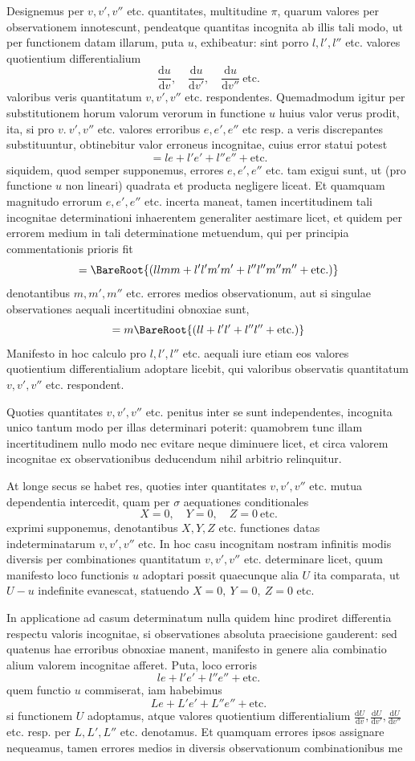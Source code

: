 Designemus per \(v,v',v''\) etc. quantitates, multitudine \(\pi\), quarum valores per observationem innotescunt, pendeatque quantitas incognita ab illis tali modo, ut per functionem datam illarum, puta \(u\), exhibeatur: sint porro \(l,l',l''\) etc. valores quotientium differentialium
\[
\frac{\mathrm du}{\mathrm dv},\quad \frac{\mathrm du}{\mathrm dv'},\quad \frac{\mathrm du}{\mathrm dv''}\ \text{etc.}
\]
valoribus veris quantitatum \(v,v',v''\) etc. respondentes. Quemadmodum igitur per substitutionem horum valorum verorum in functione \(u\) huius valor verus prodit, ita, si pro \(v.\ v',v''\) etc. valores erroribus \(e,e',e''\) etc resp. a veris discrepantes substituuntur, obtinebitur valor erroneus incognitae, cuius error statui potest
\[
=le+l'e'+l''e''+\text{etc.}
\]
siquidem, quod semper supponemus, errores \(e,e',e''\) etc. tam exigui sunt, ut (pro functione \(u\) non lineari) quadrata et producta negligere liceat. Et quamquam magnitudo errorum \(e,e',e''\) etc. incerta maneat, tamen incertitudinem tali incognitae determinationi inhaerentem generaliter aestimare licet, et quidem per errorem medium in tali determinatione metuendum, qui per principia commentationis prioris fit
\[
=\BareRoot{(llmm+l'l'm'm'+l''l''m''m''+\text{etc.})}
\]
%
denotantibus \(m,m',m''\) etc. errores medios observationum, aut si singulae observationes aequali incertitudini obnoxiae sunt,
\[
=m\BareRoot{(ll+l'l'+l''l''+\text{etc.})}
\]
Manifesto in hoc calculo pro \(l,l',l''\) etc. aequali iure etiam eos valores quotientium differentialium adoptare licebit, qui valoribus observatis quantitatum \(v,v',v''\) etc. respondent.

Quoties quantitates \(v,v',v''\) etc. penitus inter se sunt independentes, incognita unico tantum modo per illas determinari poterit: quamobrem tunc illam incertitudinem nullo modo nec evitare neque diminuere licet, et circa valorem incognitae ex observationibus deducendum nihil arbitrio relinquitur.

At longe secus se habet res, quoties inter quantitates \(v,v',v''\) etc. mutua dependentia intercedit, quam per \(\sigma\) aequationes conditionales
\[
X=0,\quad Y=0,\quad Z=0\ \text{etc.}
\]
exprimi supponemus, denotantibus \(X,Y,Z\) etc. functiones datas indeterminatarum \(v,v',v''\) etc. In hoc casu incognitam nostram infinitis modis diversis per combinationes quantitatum \(v,v',v''\) etc. determinare licet, quum manifesto loco functionis \(u\) adoptari possit quaecunque alia \(U\) ita comparata, ut \(U-u\) indefinite evanescat, statuendo \(X=0,\ Y=0,\ Z=0\) etc.

In applicatione ad casum determinatum nulla quidem hinc prodiret differentia respectu valoris incognitae, si observationes absoluta praecisione gauderent: sed quatenus hae erroribus obnoxiae manent, manifesto in genere alia combinatio alium valorem incognitae afferet. Puta, loco erroris
\[
le+l'e'+l''e''+\text{etc.}
\]
quem functio \(u\) commiserat, iam habebimus
\[
Le+L'e'+L''e''+\text{etc.}
\]
si functionem \(U\) adoptamus, atque valores quotientium differentialium \(\frac{\mathrm dU}{\mathrm dv},\frac{\mathrm dU}{\mathrm dv'},\frac{\mathrm dU}{\mathrm dv''}\) etc. resp. per \(L,L',L''\) etc. denotamus. Et quamquam errores ipsos assignare nequeamus, tamen errores medios in diversis observationum combinationibus me%
